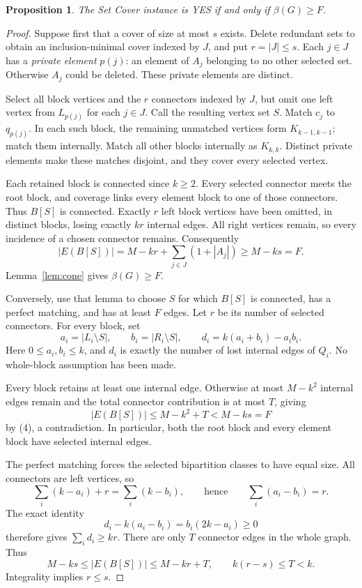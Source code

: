 \documentclass[11pt]{article}
\newtheorem{proposition}[theorem]{Proposition}
\begin{document}
\begin{proposition}\label{prop:equiv}
The Set Cover instance is YES if and only if \(\beta(G)\ge F\).
\end{proposition}
\begin{proof}
Suppose first that a cover of size at most \(s\) exists. Delete redundant
sets to obtain an inclusion-minimal cover indexed by \(J\), and put
\(r=|J|\le s\). Each \(j\in J\) has a \emph{private element} \(p(j)\):
an element of \(A_j\) belonging to no other selected set. Otherwise
\(A_j\) could be deleted. These private elements are distinct.

Select all block vertices and the \(r\) connectors indexed by \(J\),
but omit one left vertex from \(L_{p(j)}\) for each \(j\in J\).
Call the resulting vertex set \(S\). Match \(c_j\) to \(q_{p(j)}\).
In each such block, the remaining unmatched vertices form
\(K_{k-1,k-1}\); match them internally. Match all other blocks internally
as \(K_{k,k}\). Distinct private elements make these matches disjoint,
and they cover every selected vertex.

Each retained block is connected since \(k\ge2\). Every selected
connector meets the root block, and coverage links every element
block to one of those connectors. Thus \(B[S]\) is connected.
Exactly \(r\) left block vertices have been omitted, in distinct blocks,
losing exactly \(kr\) internal edges. All right vertices remain, so
every incidence of a chosen connector remains. Consequently
\[
 |E(B[S])|=M-kr+\sum_{j\in J}(1+|A_j|)
          \ge M-ks=F.
\]
Lemma~\ref{lem:cone} gives \(\beta(G)\ge F\).

Conversely, use that lemma to choose \(S\) for which \(B[S]\) is connected,
has a perfect matching, and has at least \(F\) edges. Let \(r\) be its
number of selected connectors. For every block, set
\[
 a_i=|L_i\setminus S|,\qquad b_i=|R_i\setminus S|,
 \qquad d_i=k(a_i+b_i)-a_i b_i.
\]
Here \(0\le a_i,b_i\le k\), and \(d_i\) is exactly the number of lost
internal edges of \(Q_i\). No whole-block assumption has been made.

Every block retains at least one internal edge. Otherwise at most
\(M-k^2\) internal edges remain and the total connector contribution
is at most \(T\), giving
\[
 |E(B[S])|\le M-k^2+T<M-ks=F
\]
by (4), a contradiction. In particular, both the root block and every
element block have selected internal edges.

The perfect matching forces the selected bipartition classes to have
equal size. All connectors are left vertices, so
\[
 \sum_i(k-a_i)+r=\sum_i(k-b_i),
 \qquad\text{hence}\qquad \sum_i(a_i-b_i)=r.
\]
The exact identity
\[
 d_i-k(a_i-b_i)=b_i(2k-a_i)\ge0                 \tag{6}\label{eq:loss}
\]
therefore gives \(\sum_i d_i\ge kr\). There are only \(T\) connector
edges in the whole graph. Thus
\[
 M-ks\le |E(B[S])|\le M-kr+T,\qquad k(r-s)\le T<k.
\]
Integrality implies \(r\le s\).


\end{proof}
\end{document}
